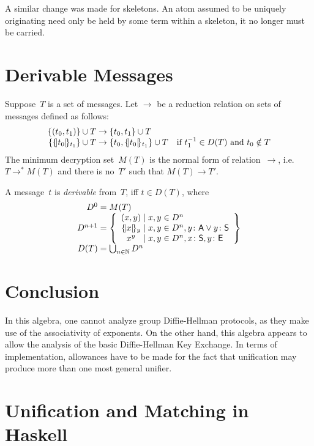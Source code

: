 \documentclass[12pt]{article}
\begin{document}
A similar change was made for skeletons.  An atom assumed to be
uniquely originating need only be held by some term within a skeleton,
it no longer must be carried.

\section{Derivable Messages}\label{sec:pen deriv mesgs}

Suppose~$T$ is a set of messages.  Let $\to$ be a reduction relation
on sets of messages defined as follows:
$$\begin{array}{r@{{}\to{}}ll}
\{(t_0,t_1)\}\cup T&\{t_0,t_1\}\cup T\\
\{\enc{t_0}{t_1}\}\cup T&\{t_0,\enc{t_0}{t_1}\}\cup T
&\mbox{if $t_1^{-1}\in D(T)$ and $t_0\notin T$}
\end{array}$$
The minimum decryption set~$M(T)$ is the normal form of relation~$\to$,
i.e.\ $T\to^\ast M(T)$ and there is no~$T'$ such that $M(T)\to T'$.

A message~$t$ is \emph{derivable} from~$T$, iff $t\in D(T)$, where
$$\begin{array}{r@{{}={}}l}
D^0&M(T)\\
D^{n+1}&\left\{\begin{array}{c@{{}\mid{}}l}
(x,y)&x,y\in D^n\\
\enc{x}{y}&x,y\in D^n,y\colon\srt{A}\lor y\colon\srt{S}\\
x^y& x,y\in D^n, x\colon\srt{S}, y\colon\srt{E}
\end{array}\right\}\\
D(T)&\bigcup_{n\in\nat}D^n
\end{array}$$

\section{Conclusion}

In this algebra, one cannot analyze group Diffie-Hellman protocols, as
they make use of the associativity of exponents.  On the other hand,
this algebra appears to allow the analysis of the basic Diffie-Hellman
Key Exchange.  In terms of implementation, allowances have to be made
for the fact that unification may produce more than one most general
unifier.




\appendix

\section{Unification and Matching in Haskell}\label{sec:haskell}
\end{document}
